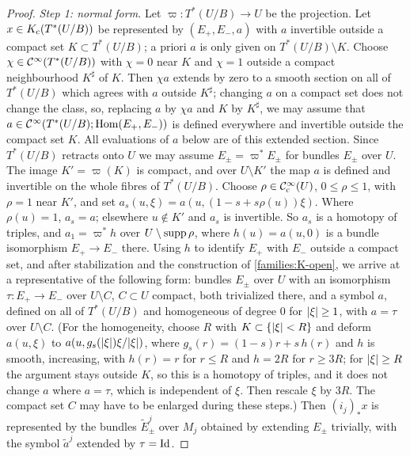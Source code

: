\begin{proof}
  \emph{Step 1: normal form.} Let $\varpi:T^*(U/B)\to U$ be the projection.
  Let $x\in K_{\mathrm{c}}(T^*(U/B))$ be represented by $(E_+,E_-,a)$ with $a$ invertible
  outside a compact set $K\subset T^*(U/B)$; a priori $a$ is only given on
  $T^*(U/B)\setminus K$. Choose $\chi\in\mathcal{C}^\infty(T^*(U/B))$ with $\chi=0$ near $K$
  and $\chi=1$ outside a compact neighbourhood $K^\sharp$ of $K$. Then $\chi a$
  extends by zero to a smooth section on all of $T^*(U/B)$ which agrees with
  $a$ outside $K^\sharp$; changing $a$ on a compact set does not change the
  class, so, replacing $a$ by $\chi a$ and $K$ by $K^\sharp$, we may assume
  that $a\in\mathcal{C}^\infty(T^*(U/B);\operatorname{Hom}(E_+,E_-))$ is defined everywhere and invertible
  outside the compact set $K$. All evaluations of $a$ below are of this
  extended section. Since $T^*(U/B)$ retracts onto $U$
  we may assume $E_\pm=\varpi^*E_\pm$ for bundles $E_\pm$ over $U$. The image
  $K'=\varpi(K)$ is compact, and over $U\setminus K'$ the map $a$ is defined
  and invertible on the whole fibres of $T^*(U/B)$. Choose $\rho\in\mathcal{C}^\infty_{\mathrm{c}}(U)$,
  $0\le\rho\le1$, with $\rho=1$ near $K'$, and set
  $a_s(u,\xi)=a(u,(1-s+s\rho(u))\xi)$. Where $\rho(u)=1$, $a_s=a$; elsewhere
  $u\notin K'$ and $a_s$ is invertible. So $a_s$ is a homotopy of triples, and
  $a_1=\varpi^*h$ over $U\setminus\operatorname{supp}\rho$, where $h(u)=a(u,0)$ is a bundle
  isomorphism $E_+\to E_-$ there. Using $h$ to identify $E_+$ with $E_-$
  outside a compact set, and after stabilization and the construction of
  \ref{families:K-open}, we arrive at a representative of the following form:
  bundles $E_\pm$ over $U$ with an isomorphism $\tau:E_+\to E_-$ over
  $U\setminus C$, $C\subset U$ compact, both trivialized there, and a symbol
  $a$, defined on all of $T^*(U/B)$ and homogeneous of degree $0$ for
  $\lvert \xi\rvert\ge1$, with $a=\tau$ over $U\setminus C$. (For the homogeneity,
  choose $R$ with $K\subset\{\lvert \xi\rvert<R\}$ and deform $a(u,\xi)$ to
  $a(u,g_s(\lvert \xi\rvert)\xi/\lvert \xi\rvert)$, where $g_s(r)=(1-s)r+s\,h(r)$ and $h$ is
  smooth, increasing, with $h(r)=r$ for $r\le R$ and $h=2R$ for $r\ge 3R$;
  for $\lvert \xi\rvert\ge R$ the argument stays outside $K$, so this is a homotopy of
  triples, and it does not change $a$ where $a=\tau$, which is independent of
  $\xi$. Then rescale $\xi$ by $3R$. The compact set $C$ may have to be
  enlarged during these steps.) Then $(i_j)_*x$ is represented by the bundles $\tilde
  E^j_\pm$ over $M_j$ obtained by extending $E_\pm$ trivially, with the
  symbol $\tilde a^j$ extended by $\tau=\operatorname{Id}$.


\end{proof}
